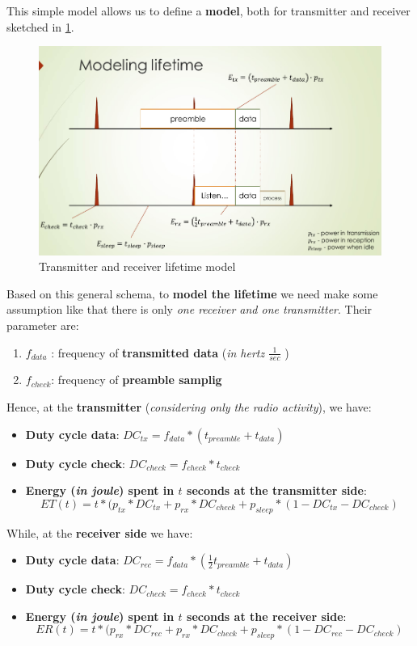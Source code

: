 \documentclass[10pt,a4paper]{report}
\theoremstyle{definition}
\begin{document}
This simple model allows us to define a \textbf{model}, both for transmitter and receiver sketched in \ref{bmac-model}.
\begin{figure}
	\centering\includegraphics[scale=0.50]{images/Pasted image 20230405104440.png}
	\caption{Transmitter and receiver lifetime model}
	\label{bmac-model}
\end{figure}
Based on this general schema, to \textbf{model the lifetime} we need make some assumption like that there is only \textit{one receiver and one transmitter}. Their parameter are:
\begin{enumerate}
	\item 
	$f_{data}$ : frequency of \textbf{transmitted data} (\textit{in hertz $\frac{1}{sec}$} )
	\item 
	$f_{check}$: frequency of \textbf{preamble samplig}
\end{enumerate}

Hence, at the \textbf{transmitter} (\textit{considering only the radio activity}), we have:
\begin{itemize}
	\item 
	\textbf{Duty cycle data}: $DC_{tx} = f_{data}*(t_{preamble}+t_{data})$
	\item 
	\textbf{Duty cycle check}: $DC_{check} = f_{check}*t_{check}$
	\item 
	\textbf{Energy (\textit{in joule}) spent in $t$ seconds at the transmitter side}:
			\begin{equation}
	ET(t) = t * (p_{tx}*DC_{tx}+p_{rx}*DC_{check}+p_{sleep}*(1-DC_{tx}-DC_{check})
			\end{equation}
\end{itemize}

While, at the \textbf{receiver side} we have:
\begin{itemize}
	\item 
	\textbf{Duty cycle data}: $DC_{rec} = f_{data}*(\frac{1}{2}t_{preamble}+t_{data})$
	\item 
	\textbf{Duty cycle check}: $DC_{check} = f_{check}*t_{check}$
	\item 
	\textbf{Energy (\textit{in joule}) spent in $t$ seconds at the receiver side}:
		\begin{equation}
			ER(t) = t * (p_{rx}*DC_{rec}+p_{rx}*DC_{check}+p_{sleep}*(1-DC_{rec}-DC_{check})
	\end{equation}

\end{itemize}
\end{document}
